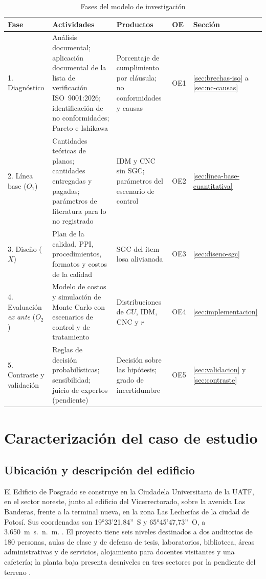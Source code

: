 \begin{table}[H]
\caption{Fases del modelo de investigación}
\label{tab:fases}
\setlength{\tabcolsep}{4pt}
\begin{tabularx}{\linewidth}{@{}P{2.7cm}LP{4.0cm}P{1.0cm}P{1.35cm}@{}}
\toprule
\textbf{Fase} & \textbf{Actividades} & \textbf{Productos} & \textbf{OE} & \textbf{Sección} \\
. Diagnóstico & Análisis documental; aplicación documental de la lista de verificación ISO~9001:2026; identificación de no conformidades; Pareto e Ishikawa & Porcentaje de cumplimiento por cláusula; no conformidades y causas & OE1 & \ref{sec:brechas-iso} a \ref{sec:nc-causas} \\
2. Línea base ($O_1$) & Cantidades teóricas de planos; cantidades entregadas y pagadas; parámetros de literatura para lo no registrado & IDM y CNC sin SGC; parámetros del escenario de control & OE2 & \ref{sec:linea-base-cuantitativa} \\
3. Diseño ($X$) & Plan de la calidad, PPI, procedimientos, formatos y costos de la calidad & SGC del ítem losa alivianada & OE3 & \ref{sec:diseno-sgc} \\
4. Evaluación \emph{ex ante} ($O_2$) & Modelo de costos y simulación de Monte Carlo con escenarios de control y de tratamiento & Distribuciones de $CU$, IDM, CNC y $r$ & OE4 & \ref{sec:implementacion} \\
5. Contraste y validación & Reglas de decisión probabilísticas; sensibilidad; juicio de expertos (pendiente) & Decisión sobre las hipótesis; grado de incertidumbre & OE5 & \ref{sec:validacion} y \ref{sec:contraste} \\
\bottomrule
\end{tabularx}
\end{table}

\section{Caracterización del caso de estudio}
\label{sec:caso}

\subsection{Ubicación y descripción del edificio}
\label{sec:ubicacion}

El Edificio de Posgrado se construye en la Ciudadela Universitaria de la UATF, en el sector noreste, junto al edificio del Vicerrectorado, sobre la avenida Las Banderas, frente a la terminal nueva, en la zona Las Lecherías de la ciudad de Potosí. Sus coordenadas son 19°33'21,84''~S y 65°45'47,73''~O, a 3.650~m~s.~n.~m. \parencite[pp.~8--9]{uatf2025pao2}. El proyecto tiene seis niveles destinados a dos auditorios de 180 personas, aulas de clase y de defensa de tesis, laboratorios, biblioteca, áreas administrativas y de servicios, alojamiento para docentes visitantes y una cafetería; la planta baja presenta desniveles en tres sectores por la pendiente del terreno \parencite[p.~1]{uatf_item13}.

